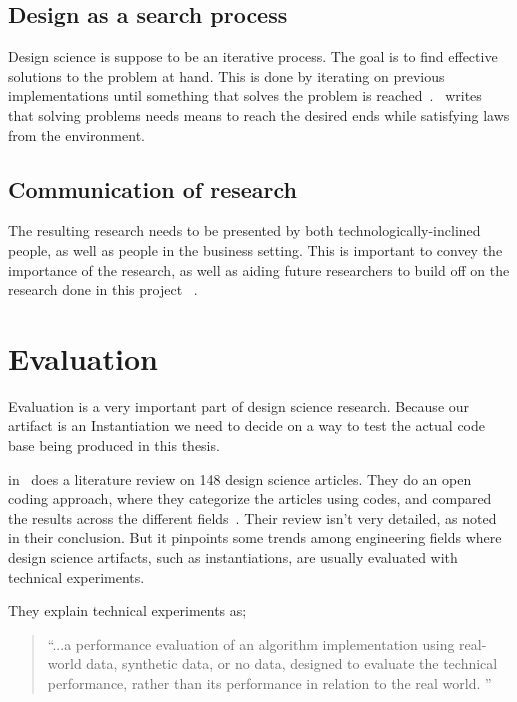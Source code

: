 \documentclass[../Main/thesis.tex]{subfiles}
\begin{document}
\subsection*{Design as a search process}%
\label{sub:design_as_a_search_process}
Design science is suppose to be an iterative process. The goal is to find
effective solutions to the problem at hand. This is done by iterating on
previous implementations until something that solves the problem is
reached~\cite{Hevner:2004:DSI:2017212.2017217}.~\citeauthor{Hevner:2004:DSI:2017212.2017217}
writes that solving problems needs means to reach the desired ends while
satisfying laws from the environment.

\subsection*{Communication of research}%
\label{sub:communication_of_research}
The resulting research needs to be presented by both technologically-inclined
people, as well as people in the business setting. This is important to convey
the importance of the research, as well as aiding future researchers to build
off on the research done in this project ~\cite{Hevner:2004:DSI:2017212.2017217}.


\section{Evaluation}%
\label{sec:methodology_evaluation}
Evaluation is a very important part of design science research. Because our
artifact is an Instantiation we need to decide on a way to test the actual code
base being produced in this thesis.

\citeauthor{Peffers:2012:DSR:2342209.2342243}
in~ does a literature review on 148
design science articles. They do an open coding approach, where they categorize
the articles using codes, and compared the results across the different
fields~\cite{Peffers:2012:DSR:2342209.2342243}. Their review isn't very
detailed, as noted in their conclusion. But it pinpoints some trends among
engineering fields where design science artifacts, such as instantiations,
are usually evaluated with technical experiments.

They explain technical experiments as;
\begin{quotation}
    ``...a performance evaluation of an algorithm implementation using real-world
    data, synthetic data, or no data, designed to evaluate the technical
    performance, rather than its performance in relation to the real world.
    ''~\cite[p.~402]{Peffers:2012:DSR:2342209.2342243}
\end{quotation}
\end{document}
